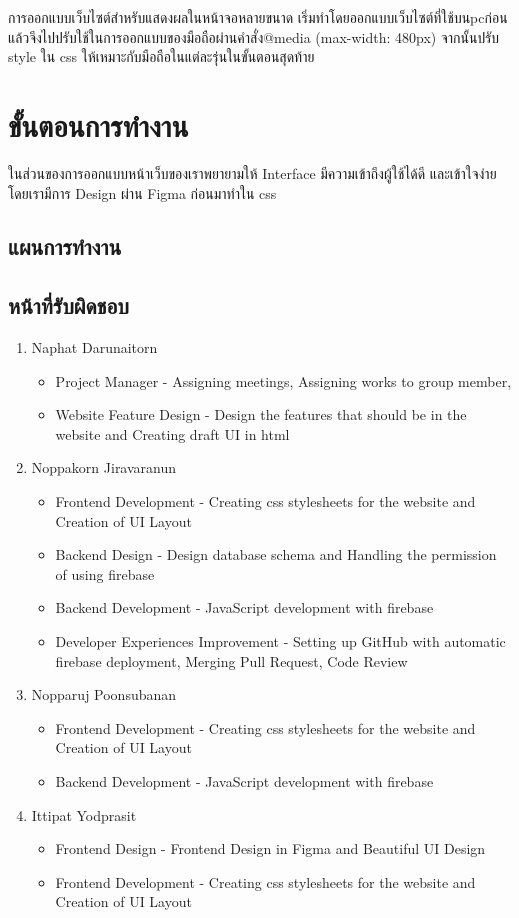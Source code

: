 \documentclass[17pt]{extarticle}
\begin{document}
การออกแบบเว็บไซต์สำหรับแสดงผลในหน้าจอหลายขนาด เริ่มทำโดยออกแบบเว็บไซต์ที่ใช้บนpcก่อน แล้วจึงไปปรับใช้ในการออกแบบของมือถือผ่านคำสั่ง@media (max-width: 480px)
จากนั้นปรับ style ใน css ให้เหมาะกับมือถือในแต่ละรุ่นในขั้นตอนสุดท้าย

\section{ขั้นตอนการทำงาน}
ในส่วนของการออกแบบหน้าเว็บของเราพยายามให้ Interface มีความเข้าถึงผู้ใช้ได้ดี และเข้าใจง่าย โดยเรามีการ Design ผ่าน Figma ก่อนมาทำใน css
\subsection{แผนการทำงาน}
\label{sec:plan}
\subsection{หน้าที่รับผิดชอบ}
\begin{enumerate}
    \item Naphat Darunaitorn
          \begin{itemize}
              \item Project Manager - Assigning meetings, Assigning works to group member,
              \item Website Feature Design - Design the features that should be in the website and Creating draft UI in html
          \end{itemize}
    \item Noppakorn Jiravaranun
          \begin{itemize}
              \item Frontend Development - Creating css stylesheets for the website and Creation of UI Layout
              \item Backend Design - Design database schema and Handling the permission of using firebase
              \item Backend Development - JavaScript development with firebase
              \item Developer Experiences Improvement - Setting up GitHub with automatic firebase deployment, Merging Pull Request, Code Review
          \end{itemize}
    \item Nopparuj Poonsubanan
          \begin{itemize}
              \item Frontend Development - Creating css stylesheets for the website and Creation of UI Layout
              \item Backend Development - JavaScript development with firebase
          \end{itemize}
    \item Ittipat Yodprasit
          \begin{itemize}
              \item Frontend Design - Frontend Design in Figma and Beautiful UI Design
              \item Frontend Development - Creating css stylesheets for the website and Creation of UI Layout
          \end{itemize}
\end{enumerate}
\end{document}
